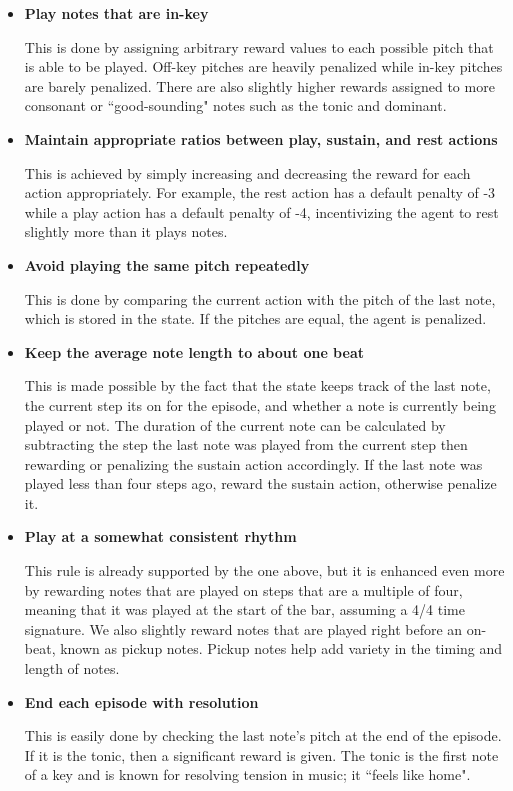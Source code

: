 \documentclass{article}
\begin{document}
\begin{itemize}
    \item \textbf{Play notes that are in-key}
    \begin{flushleft}
        This is done by assigning arbitrary reward values to each possible pitch that is able to be played. Off-key pitches are heavily penalized while in-key pitches are barely penalized. There are also slightly higher rewards assigned to more consonant or ``good-sounding" notes such as the tonic and dominant.
    \end{flushleft}
    \item \textbf{Maintain appropriate ratios between play, sustain, and rest actions}
    \begin{flushleft}
        This is achieved by simply increasing and decreasing the reward for each action appropriately. For example, the rest action has a default penalty of -3 while a play action has a default penalty of -4, incentivizing the agent to rest slightly more than it plays notes.
    \end{flushleft}
    \item \textbf{Avoid playing the same pitch repeatedly}
    \begin{flushleft}
        This is done by comparing the current action with the pitch of the last note, which is stored in the state. If the pitches are equal, the agent is penalized.
    \end{flushleft}
    \item \textbf{Keep the average note length to about one beat}
    \begin{flushleft}
        This is made possible by the fact that the state keeps track of the last note, the current step its on for the episode, and whether a note is currently being played or not. The duration of the current note can be calculated by subtracting the step the last note was played from the current step then rewarding or penalizing the sustain action accordingly. If the last note was played less than four steps ago, reward the sustain action, otherwise penalize it.
    \end{flushleft}
    \item \textbf{Play at a somewhat consistent rhythm}
    \begin{flushleft}
        This rule is already supported by the one above, but it is enhanced even more by rewarding notes that are played on steps that are a multiple of four, meaning that it was played at the start of the bar, assuming a 4/4 time signature. We also slightly reward notes that are played right before an on-beat, known as pickup notes. Pickup notes help add variety in the timing and length of notes.
    \end{flushleft}
    \item \textbf{End each episode with resolution}
    \begin{flushleft}
        This is easily done by checking the last note's pitch at the end of the episode. If it is the tonic, then a significant reward is given. The tonic is the first note of a key and is known for resolving tension in music; it ``feels like home".
    \end{flushleft}
\end{itemize}
\end{document}
